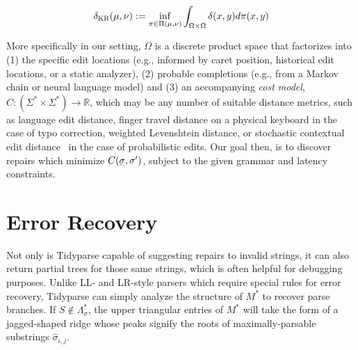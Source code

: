 \documentclass[sigplan,nonacm]{acmart}\settopmatter{printfolios=false,printccs=false,printacmref=false}
\begin{document}
\begin{align}
  \delta_{\textsc{KR}}(\mu, \nu) := \inf_{\pi\in \Pi(\mu, \nu)}\int_{\Omega\times \Omega} \delta(x, y)d\pi(x, y)
\end{align}

More specifically in our setting, $\Omega$ is a discrete product space that factorizes into (1) the specific edit locations (e.g., informed by caret position, historical edit locations, or a static analyzer), (2) probable completions (e.g., from a Markov chain or neural language model) and (3) an accompanying \textit{cost model}, $C: (\Sigma^* \times \Sigma^*) \rightarrow \mathbb{R}$, which may be any number of suitable distance metrics, such as language edit distance, finger travel distance on a physical keyboard in the case of typo correction, weighted Levenshtein distance, or stochastic contextual edit distance~\cite{cotterell+al.acl14} in the case of probabilistic edits. Our goal then, is to discover repairs which minimize $C(\err{\sigma}, \sigma')$, subject to the given grammar and latency constraints.

\pagebreak
\section{Error Recovery}\label{sec:error}

Not only is Tidyparse capable of suggesting repairs to invalid strings, it can also return partial trees for those same strings, which is often helpful for debugging purposes. Unlike LL- and LR-style parsers which require special rules for error recovery, Tidyparse can simply analyze the structure of $M^*$ to recover parse branches. If $S \notin  \Lambda^*_\sigma$, the upper triangular entries of $M^*$ will take the form of a jagged-shaped ridge whose peaks signify the roots of maximally-parsable substrings $\hat{\sigma}_{i, j}$.
\end{document}
